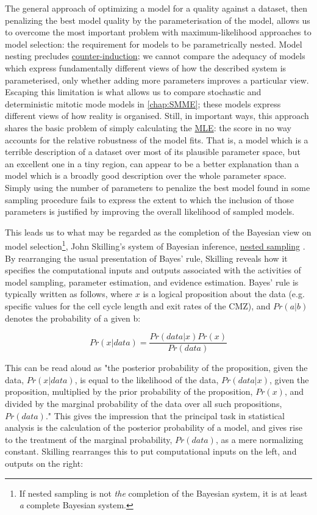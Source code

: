 The general approach of optimizing a model for a quality against a dataset, then penalizing the best model quality by the parameterisation of the model, allows us to overcome the most important problem with maximum-likelihood approaches to model selection: the requirement for models to be parametrically nested. Model nesting precludes \hyperref[sec:Feyerabend]{counter-induction}; we cannot compare the adequacy of models which express fundamentally different views of how the described system is parameterised, only whether adding more parameters improves a particular view. Escaping this limitation is what allows us to compare stochastic and deterministic mitotic mode models in \autoref{chap:SMME}; these models express different views of how reality is organised. Still, in important ways, this approach shares the basic problem of simply calculating the \hyperref[ssec:MLE]{MLE}: the score in no way accounts for the relative robustness of the model fits. That is, a model which is a terrible description of a dataset over most of its plausible parameter space, but an excellent one in a tiny region, can appear to be a better explanation than a model which is a broadly good description over the whole parameter space. Simply using the number of parameters to penalize the best model found in some sampling procedure fails to express the extent to which the inclusion of those parameters is justified by improving the overall likelihood of sampled models.

This leads us to what may be regarded as the completion of the Bayesian view on model selection\footnote{If nested sampling is not \textit{the} completion of the Bayesian system, it is at least \textit{a} complete Bayesian system.}, John Skilling's system of Bayesian inference, \hyperref[ssec:nested]{nested sampling} \cite{Skilling2006,Skilling2012,Skilling2019}. By rearranging the usual presentation of Bayes' rule, Skilling reveals how it specifies the computational inputs and outputs associated with the activities of model sampling, parameter estimation, and evidence estimation. Bayes' rule is typically written as follows, where $x$ is a logical proposition about the data (e.g. specific values for the cell cycle length and exit rates of the CMZ), and $Pr(a|b)$ denotes the probability of a given b:

\[Pr(x|data) = \frac{Pr(data|x)Pr(x)}{Pr(data)}\]

This can be read aloud as "the posterior probability of the proposition, given the data, $Pr(x|data)$, is equal to the likelihood of the data, $Pr(data|x)$, given the proposition, multiplied by the prior probability of the proposition, $Pr(x)$, and divided by the marginal probability of the data over all such propositions, $Pr(data)$." This gives the impression that the principal task in statistical analysis is the calculation of the posterior probability of a model, and gives rise to the treatment of the marginal probability, $Pr(data)$, as a mere normalizing constant. Skilling rearranges this to put computational inputs on the left, and outputs on the right:

